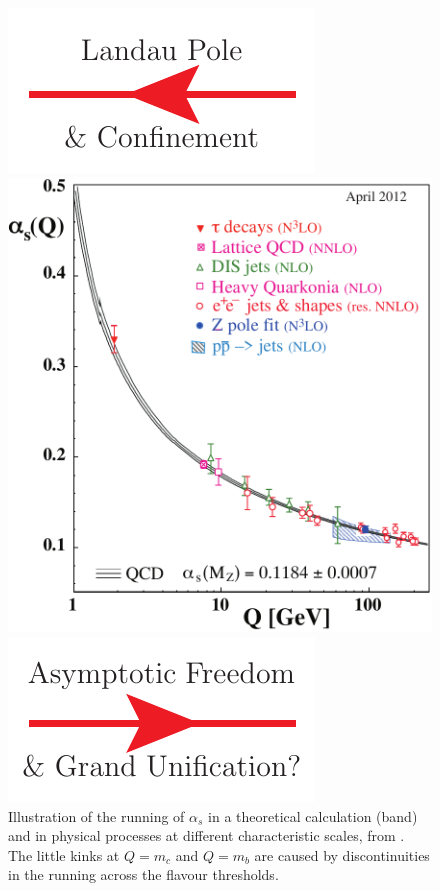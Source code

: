 \begin{figure}[t]
\begin{center}\hspace*{-0.25cm}
\parbox[c]{3.1cm}{\includegraphics*[scale=0.65]{arr-ir.pdf}}
\parbox[c]{8cm}{\includegraphics*[scale=0.5]{asq-2011.pdf}}\hspace*{-1mm}
\parbox[c]{3.1cm}{\includegraphics*[scale=0.65]{arr-uv.pdf}}
\caption{Illustration of the running of $\alpha_s$ in a theoretical
  calculation (band) and in physical processes at
  different characteristic scales, from
  \cite{pdg2012,Bethke:2012jm}. The little kinks at $Q=m_{c}$ and
  $Q=m_b$ are
  caused by discontinuities in the running across the flavour
  thresholds.\label{fig:alphas}}  
\end{center}           
\end{figure}
